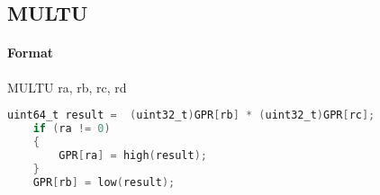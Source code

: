 \subsection{MULTU}


\paragraph{Format} MULTU ra, rb, rc, rd

\begin{lstlisting}[language=C]
    uint64_t result =  (uint32_t)GPR[rb] * (uint32_t)GPR[rc];
    if (ra != 0)
    {
        GPR[ra] = high(result);
    }
    GPR[rb] = low(result);
\end{lstlisting}